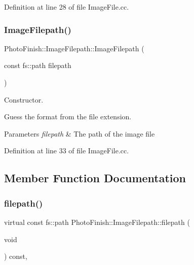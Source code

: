 Definition at line 28 of file Image\+File.\+cc.

\mbox{\label{class_photo_finish_1_1_image_filepath_a7fb4ce09dba96f24ae704a27e9ef436e}} 
\subsubsection{\texorpdfstring{Image\+Filepath()}{ImageFilepath()}\hspace{0.1cm}{\footnotesize\ttfamily [2/2]}}
{\footnotesize\ttfamily Photo\+Finish\+::\+Image\+Filepath\+::\+Image\+Filepath (\begin{DoxyParamCaption}\item[{const fs\+::path}]{filepath }\end{DoxyParamCaption})}



Constructor. 

Guess the format from the file extension. 
\begin{DoxyParams}{Parameters}
{\em filepath} & The path of the image file \\
\hline
\end{DoxyParams}


Definition at line 33 of file Image\+File.\+cc.



\subsection{Member Function Documentation}
\mbox{\label{class_photo_finish_1_1_image_filepath_ae9e93bc121205dbc65545e43a58a22a2}} 
\subsubsection{\texorpdfstring{filepath()}{filepath()}}
{\footnotesize\ttfamily virtual const fs\+::path Photo\+Finish\+::\+Image\+Filepath\+::filepath (\begin{DoxyParamCaption}\item[{void}]{ }\end{DoxyParamCaption}) const\hspace{0.3cm}{\ttfamily [inline]}, {\ttfamily [virtual]}}



